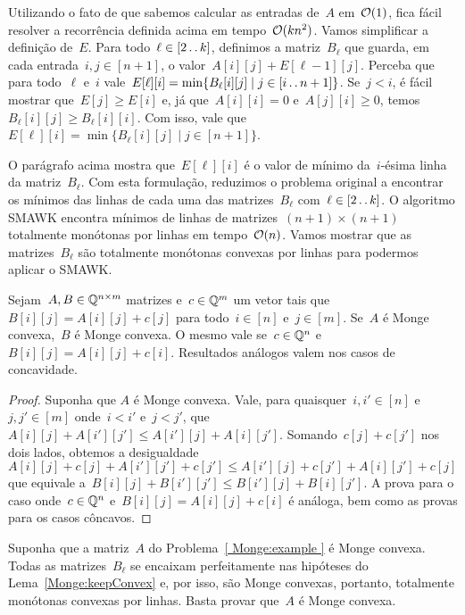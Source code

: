 Utilizando o fato de que sabemos calcular as entradas de~$A$ em~$\mathcal{O}(1)$, fica fácil resolver a recorrência definida acima em tempo~${ \mathcal{O}(kn^2) }$. Vamos simplificar a definição de~$E$. Para todo~${ \ell \in [2 \,.\,.\, k] }$, definimos a matriz~$B_\ell$ que guarda, em cada entrada~${ i,j \in [n+1] }$, o valor~${ A[i][j] + E[\ell-1][j] }$. Perceba que para todo~$\ell$ e~$i$ vale~${ E[\ell][i] = \min\{ B_\ell[i][j] \mid j \in [i \,.\,.\, n+1] \}}$. Se~${ j < i }$, é fácil mostrar que~${ E[j] \geq E[i] }$ e, já que~${ A[i][i] = 0 }$ e~${ A[j][i] \geq 0 }$, temos~${ B_\ell[i][j] \geq B_\ell[i][i] }$. Com isso, vale que~${ E[\ell][i] = \min\{ B_\ell[i][j] \mid j \in [n+1] \} }$. 

O parágrafo acima mostra que~$E[\ell][i]$ é o valor de mínimo da~$i$-ésima linha da matriz~$B_\ell$. Com esta formulação, reduzimos o problema original a encontrar os mínimos das linhas de cada uma das matrizes~$B_\ell$ com~$\ell \in [2 \,.\,.\, k]$. O algoritmo SMAWK encontra mínimos de linhas de matrizes~${ (n+1) \times (n+1) }$ totalmente monótonas por linhas em tempo~$\mathcal{O}(n)$. Vamos mostrar que as matrizes~$B_\ell$ são totalmente monótonas convexas por linhas para podermos aplicar o SMAWK.

\begin{lema} \label{Monge:keepConvex}
Sejam~${ A,B \in \mathbb{Q}^{n \times m} }$ matrizes e~${ c \in \mathbb{Q}^m }$ um vetor tais que~${ B[i][j] = A[i][j] + c[j] }$ para todo~${ i \in [n] }$ e~${ j \in [m] }$. Se~$A$ é Monge convexa,~$B$ é Monge convexa. O mesmo vale se~$c \in \mathbb{Q}^n$ e~${B[i][j] = A[i][j] + c[i]}$. Resultados análogos valem nos casos de concavidade.
\end{lema}

\begin{proof}
Suponha que $A$ é Monge convexa. Vale, para quaisquer~${ i,i' \in [n]}$ e~${ j,j' \in [m] }$ onde~${ i < i' }$ e~${ j < j' }$, que~${A[i][j] + A[i'][j'] \leq A[i'][j] + A[i][j']}$. Somando~${ c[j] + c[j'] }$ nos dois lados, obtemos a desigualdade~${A[i][j] + c[j] + A[i'][j'] + c[j'] \leq A[i'][j] + c[j'] + A[i][j'] + c[j]}$ que equivale a~${B[i][j] + B[i'][j'] \leq B[i'][j] + B[i][j']}$. A prova para o caso onde~$c \in \mathbb{Q}^n$ e~${B[i][j] = A[i][j] + c[i]}$ é análoga, bem como as provas para os casos côncavos.
\end{proof}

Suponha que a matriz~$A$ do Problema~\ref{ Monge:example } é Monge convexa. Todas as matrizes~$B_\ell$ se encaixam perfeitamente nas hipóteses do Lema~\ref{Monge:keepConvex} e, por isso, são Monge convexas, portanto, totalmente monótonas convexas por linhas. Basta provar que~$A$ é Monge convexa.

